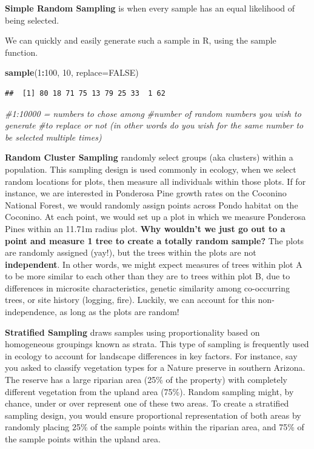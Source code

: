 \documentclass[
]{book}
\newenvironment{Shaded}{\begin{snugshade}}{\end{snugshade}}
\newcommand{\AttributeTok}[1]{\textcolor[rgb]{0.13,0.29,0.53}{#1}}
\newcommand{\CommentTok}[1]{\textcolor[rgb]{0.56,0.35,0.01}{\textit{#1}}}
\newcommand{\ConstantTok}[1]{\textcolor[rgb]{0.56,0.35,0.01}{#1}}
\newcommand{\DecValTok}[1]{\textcolor[rgb]{0.00,0.00,0.81}{#1}}
\newcommand{\FunctionTok}[1]{\textcolor[rgb]{0.13,0.29,0.53}{\textbf{#1}}}
\newcommand{\NormalTok}[1]{#1}
\newcommand{\SpecialCharTok}[1]{\textcolor[rgb]{0.81,0.36,0.00}{\textbf{#1}}}
\begin{document}
\textbf{Simple Random Sampling} is when every sample has an equal likelihood of being selected.

We can quickly and easily generate such a sample in R, using the sample function.

\begin{Shaded}
\begin{Highlighting}[]
\FunctionTok{sample}\NormalTok{(}\DecValTok{1}\SpecialCharTok{:}\DecValTok{100}\NormalTok{, }\DecValTok{10}\NormalTok{, }\AttributeTok{replace=}\ConstantTok{FALSE}\NormalTok{)}
\end{Highlighting}
\end{Shaded}

\begin{verbatim}
##  [1] 80 18 71 75 13 79 25 33  1 62
\end{verbatim}

\begin{Shaded}
\begin{Highlighting}[]
\CommentTok{\#1:10000 = numbers to chose among }
\CommentTok{\#number of random numbers you wish to generate}
\CommentTok{\#to replace or not (in other words do you wish for the same number to be selected multiple times)}
\end{Highlighting}
\end{Shaded}

\textbf{Random Cluster Sampling} randomly select groups (aka clusters) within a population. This sampling design is used commonly in ecology, when we select random locations for plots, then measure all individuals within those plots. If for instance, we are interested in Ponderosa Pine growth rates on the Coconino National Forest, we would randomly assign points across Pondo habitat on the Coconino. At each point, we would set up a plot in which we measure Ponderosa Pines within an 11.71m radius plot. \textbf{Why wouldn't we just go out to a point and measure 1 tree to create a totally random sample?} The plots are randomly assigned (yay!), but the trees within the plots are not \textbf{independent}. In other words, we might expect measures of trees within plot A to be more similar to each other than they are to trees within plot B, due to differences in microsite characteristics, genetic similarity among co-occurring trees, or site history (logging, fire). Luckily, we can account for this non-independence, as long as the plots are random!

\textbf{Stratified Sampling} draws samples using proportionality based on homogeneous groupings known as strata. This type of sampling is frequently used in ecology to account for landscape differences in key factors. For instance, say you asked to classify vegetation types for a Nature preserve in southern Arizona. The reserve has a large riparian area (25\% of the property) with completely different vegetation from the upland area (75\%). Random sampling might, by chance, under or over represent one of these two areas. To create a stratified sampling design, you would ensure proportional representation of both areas by randomly placing 25\% of the sample points within the riparian area, and 75\% of the sample points within the upland area.
\end{document}
